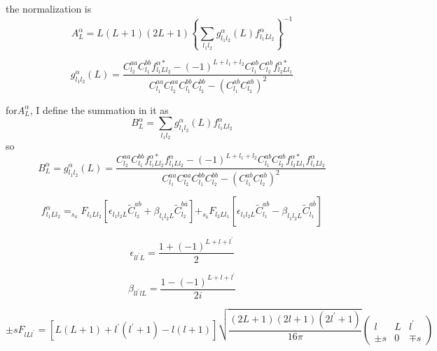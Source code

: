 \documentclass[11pt]{article}
\begin{document}
the normalization is 
\begin{equation}
A_{L}^{\alpha}=L(L+1)(2 L+1)\left\{\sum_{l_{1} l_{2}} g_{l_{1} l_{2}}^{\alpha}(L) f_{l_{1} L l_{2}}^{\alpha}\right\}^{-1}
\end{equation}

\begin{equation}
g_{l_{1} l_{2}}^{\alpha}(L)=\frac{C_{l_{2}}^{a a} C_{l_{1}}^{b b} f_{l_{1} L l_{2}}^{\alpha *}-(-1)^{L+l_{1}+l_{2}} C_{l_{1}}^{a b} C_{l_{2}}^{a b} f_{l_{2} L l_{1}}^{\alpha *}}{C_{l_{1}}^{a a} C_{l_{2}}^{a a} C_{l_{1}}^{b b} C_{l_{2}}^{b b}-\left(C_{l_{1}}^{a b} C_{l_{2}}^{a b}\right)^{2}}
\end{equation}


for$A_{L}^{\alpha}$, I define the summation in it as
\begin{equation}
B_{L}^{\alpha}
=\sum_{l_{1} l_{2}} g_{l_{1} l_{2}}^{\alpha}(L) f_{l_{1}Ll_{2}}^{\alpha}
\end{equation}
so 
\begin{equation}
B_{L}^{\alpha}=g_{l_{1} l_{2}}^{\alpha}(L)=\frac{C_{l_{2}}^{a a} C_{l_{1}}^{b b} f_{l_{1} L l_{2}}^{\alpha *}f_{l_{1}Ll_{2}}^{\alpha}-(-1)^{L+l_{1}+l_{2}} C_{l_{1}}^{a b} C_{l_{2}}^{a b} f_{l_{2} L l_{1}}^{\alpha *}f_{l_{1}Ll_{2}}^{\alpha}}{C_{l_{1}}^{a a} C_{l_{2}}^{a a} C_{l_{1}}^{b b} C_{l_{2}}^{b b}-\left(C_{l_{1}}^{a b} C_{l_{2}}^{a b}\right)^{2}}
\end{equation}

\begin{equation}
f_{l_{1} L l_{2}}^{\alpha}=_{s_{a}} F_{l_{1} L l_{2}}\left[\epsilon_{l_{1} l_{2} L} \tilde{C}_{l_{2}}^{a b}+\beta_{l_{1} l_{2} L} \tilde{C}_{l_{2}}^{b \overline{a}}\right]+_{s_{b}} F_{l_{2} L l_{1}}\left[\epsilon_{l_{1} l_{2} L} \tilde{C}_{l_{1}}^{a b}-\beta_{l_{1} l_{2} L} \tilde{C}_{l_{1}}^{a \overline{b}}\right]
\end{equation}

\begin{equation}
\epsilon_{l l^{\prime} L}=\frac{1+(-1)^{L+l+l^{\prime}}}{2}
\end{equation}

\begin{equation}
\beta_{l l^{\prime} l L}=\frac{1-(-1)^{L+l+l^{\prime}}}{2 i}
\end{equation}

\begin{equation}
\pm s F_{l L l^{\prime}}=\left[L(L+1)+l^{\prime}\left(l^{\prime}+1\right)-l(l+1)\right] \sqrt{\frac{(2 L+1)(2 l+1)\left(2 l^{\prime}+1\right)}{16 \pi}} \left( \begin{array}{ccc}{l} & {L} & {l^{\prime}} \\ { \pm s} & {0} & {\mp s}\end{array}\right)
\end{equation}
\end{document}
